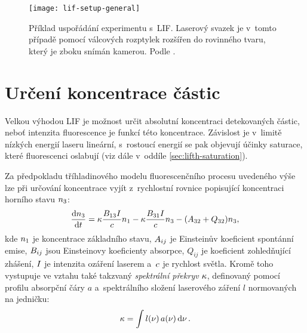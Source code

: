 \begin{figure}[htb]
	\centering
	\texttt{[image: lif-setup-general]}
	\caption{Příklad uspořádání experimentu s~LIF.
		Laserový svazek je v~tomto případě pomocí válcových rozptylek
		rozšířen do rovinného tvaru, který je zboku snímán kamerou.
		Podle \cite{lif-oh}.}
	\label{fig:lifth-setup}
\end{figure}

\section{Určení koncentrace částic}
\label{sec:lifth-concentration}
\providecommand\vol{V}
\providecommand\sensabs{D_\text{a}}
\providecommand\lifsens{D_\text{F}}
\providecommand\rayleighsens{D_\text{R}}
\providecommand\lifsignal{M_\text{F}}
\providecommand\rayleighsignal{M_\text{R}}
\providecommand\lifeff{\qeff_\text{F}}
\providecommand\rayleigheff{\qeff_\text{R}}
\providecommand\rayleighdxsect{\dv{\sigma_\text{R}}{\solidangle}}
\providecommand\rayleighndens{\ndens_\text{R}}
\providecommand\enlaserrayleigh{L_\text{R}}
\providecommand\beamprofile{s}
\providecommand\quenching{Q}
\providecommand\liftotal{F}
Velkou výhodou LIF je možnost určit absolutní koncentraci detekovaných částic,
neboť intenzita fluorescence je funkcí této koncentrace.
Závislost je v~limitě nízkých energií laseru lineární,
s~rostoucí energií se pak objevují účinky saturace,
které fluorescenci oslabují (viz dále v~oddíle \ref{sec:lifth-saturation}).

Za předpokladu tříhladinového modelu fluorescenčního procesu uvedeného výše
lze při určování koncentrace vyjít z~rychlostní rovnice popisující
koncentraci horního stavu $n_3$:
\begin{equation}
	\label{eq:lifth-rate-simple}
	\dv{\ndens_3}{\tim}
	= \specoverlap \frac{\einsteinb13 \ity}{\lightspeed} \ndens_1
	- \specoverlap \frac{\einsteinb31 \ity}{\lightspeed} \ndens_3
	- ( \einsteina32 + \quenching_{32} ) \ndens_3,
\end{equation}
kde $n_1$ je koncentrace základního stavu,
$A_{ij}$ je Einsteinův koeficient spontánní emise,
$B_{ij}$ jsou Einsteinovy koeficienty absorpce,
$\quenching_{ij}$ je koeficient zohledňující zhášení,
$I$ je intenzita ozáření laserem
a~$c$ je rychlost světla.
Kromě toho vystupuje ve vztahu také takzvaný
\emph{spektrální překryv} $\kappa$,
definovaný pomocí profilu absorpční čáry $a$
a~spektrálního složení laserového záření $l$ normovaných na jedničku:
\begin{equation}
	\label{eq:lifth-specoverlap}
	\kappa = \int l(\nu)\,a(\nu) \dd{\nu}.
\end{equation}

